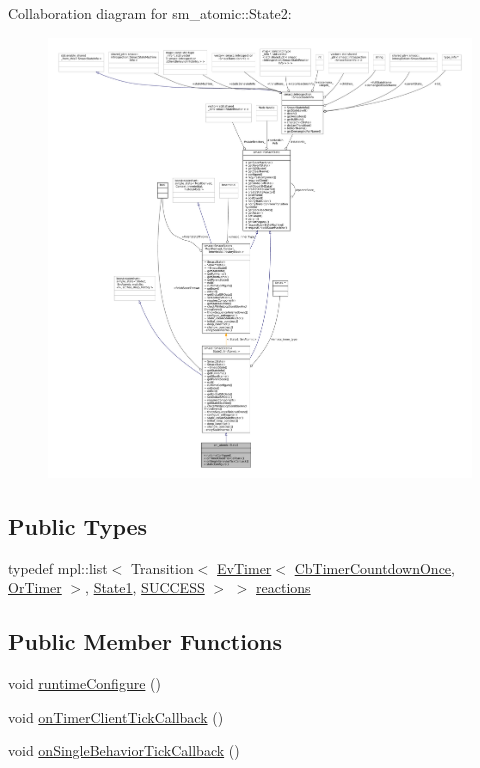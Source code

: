 Collaboration diagram for sm\+\_\+atomic\+:\+:State2\+:
\nopagebreak
\begin{figure}[H]
\begin{center}
\leavevmode
\includegraphics[width=350pt]{structsm__atomic_1_1State2__coll__graph}
\end{center}
\end{figure}
\subsection*{Public Types}
\begin{DoxyCompactItemize}
\item 
typedef mpl\+::list$<$ Transition$<$ \hyperlink{structcl__ros__timer_1_1EvTimer}{Ev\+Timer}$<$ \hyperlink{classcl__ros__timer_1_1CbTimerCountdownOnce}{Cb\+Timer\+Countdown\+Once}, \hyperlink{classsm__atomic_1_1OrTimer}{Or\+Timer} $>$, \hyperlink{structsm__atomic_1_1State1}{State1}, \hyperlink{structsmacc_1_1default__transition__tags_1_1SUCCESS}{S\+U\+C\+C\+E\+SS} $>$ $>$ \hyperlink{structsm__atomic_1_1State2_a9436556de6be8ea64fd35707aa4bfec8}{reactions}
\end{DoxyCompactItemize}
\subsection*{Public Member Functions}
\begin{DoxyCompactItemize}
\item 
void \hyperlink{structsm__atomic_1_1State2_afd749890e13d8aa36f1ac6645a5f7f9a}{runtime\+Configure} ()
\item 
void \hyperlink{structsm__atomic_1_1State2_ab265295bfddde63b2dcf5f97bfc44e48}{on\+Timer\+Client\+Tick\+Callback} ()
\item 
void \hyperlink{structsm__atomic_1_1State2_a871fb6c688a61bb4902ea6d44f51025c}{on\+Single\+Behavior\+Tick\+Callback} ()
\end{DoxyCompactItemize}
